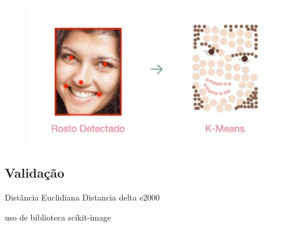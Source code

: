\begin{figure}[h]
\caption{}
\centering

\includegraphics[]{Template_Latex_TCC-UNIFTEC/_lib/imagens/kmeans.png}

\label{fig: kmeans }
\end{figure}


\subsection{Validação}
Distância Euclidiana 
Distancia delta e2000

uso de biblioteca scikit-image

\label{cap:fundamentacao-teorica}
